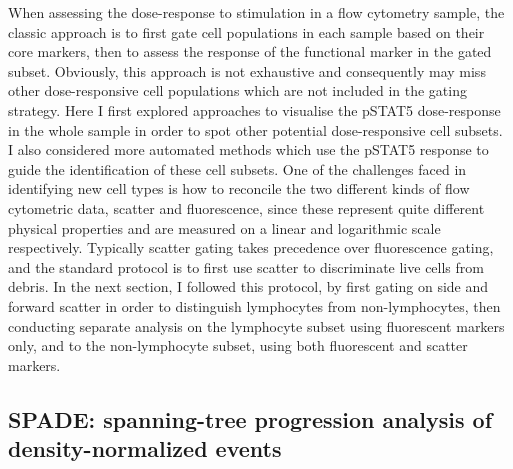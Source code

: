 When assessing the dose-response to stimulation in a flow cytometry sample, the classic approach is to first gate cell populations in each sample based on their core markers,
then to assess the response of the functional marker in the gated subset.
Obviously, this approach is not exhaustive and consequently may miss other dose-responsive cell populations which are not included in the gating strategy.
Here I first explored approaches to visualise the pSTAT5 dose-response in the whole sample in order to spot other potential dose-responsive cell subsets.
I also considered more automated methods which use the pSTAT5 response to guide the identification of these cell subsets.
One of the challenges faced in identifying new cell types is how to reconcile the two different kinds of flow cytometric data, scatter and fluorescence, since these represent quite different physical properties and are measured on a linear and logarithmic scale respectively.
Typically scatter gating takes precedence over fluorescence gating, and the standard protocol is to first use scatter to discriminate live cells from debris.
In the next section, I followed this protocol, by first gating on side and forward scatter in order to distinguish lymphocytes from non-lymphocytes, then conducting separate analysis on the lymphocyte subset using fluorescent markers only, and to the non-lymphocyte subset, using both fluorescent and scatter markers.


\subsection{SPADE: spanning-tree progression analysis of density-normalized events}


